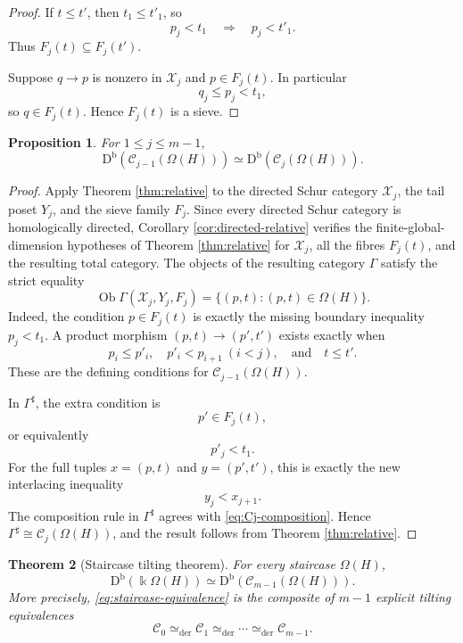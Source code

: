 \documentclass[12pt,a4paper,english,reqno]{amsart}
\theoremstyle{plain}
\newtheorem{theorem}{Theorem}[section]
\newtheorem{proposition}[theorem]{Proposition}
\theoremstyle{definition}
\newcommand{\kk}{\Bbbk}
\newcommand{\Db}{\mathrm D^{\mathrm b}}
\newcommand{\C}{\mathcal C}
\newcommand{\X}{\mathcal X}
\newcommand{\G}{\Gamma}
\newcommand{\Gs}{\Gamma^{\sharp}}
\begin{document}
\begin{proof}
If $t\leq t'$, then $t_1\leq t'_1$, so
\[
 p_j<t_1\quad\Longrightarrow\quad p_j<t'_1.
\]
Thus $F_j(t)\subseteq F_j(t')$.

Suppose $q\to p$ is nonzero in $\X_j$ and $p\in F_j(t)$.  In particular
\[
 q_j\leq p_j<t_1,
\]
so $q\in F_j(t)$.  Hence $F_j(t)$ is a sieve.
\end{proof}

\begin{proposition}
\label{prop:one-step}
For $1\leq j\leq m-1$,
\[
 \Db(\C_{j-1}(\Omega(H)))
 \simeq
 \Db(\C_j(\Omega(H))).
\]
\end{proposition}

\begin{proof}
Apply Theorem \ref{thm:relative} to the directed Schur category $\X_j$, the tail
poset $Y_j$, and the sieve family $F_j$.  Since every directed Schur
category is homologically directed, Corollary \ref{cor:directed-relative}
verifies the finite-global-dimension hypotheses of Theorem \ref{thm:relative} for
$\X_j$, all the fibres $F_j(t)$, and the resulting total category.
The objects of the resulting
category $\G$ satisfy the strict equality
\[
 \operatorname{Ob}\G(\X_j,Y_j,F_j)
 =
 \{(p,t):(p,t)\in\Omega(H)\}.
\]
Indeed, the condition $p\in F_j(t)$ is exactly the missing boundary
inequality $p_j<t_1$. A product morphism $(p,t)\to(p',t')$ exists exactly when
\[
 p_i\leq p'_i,\quad p'_i<p_{i+1}\ (i<j),
 \quad\text{and}\quad t\leq t'.
\]
These are the defining conditions for
$\C_{j-1}(\Omega(H))$.

In $\Gs$, the extra condition is
\[
 p'\in F_j(t),
\]
or equivalently
\[
 p'_j<t_1.
\]
For the full tuples $x=(p,t)$ and $y=(p',t')$, this is exactly the new
interlacing inequality
\[
 y_j<x_{j+1}.
\]
The composition rule in $\Gs$ agrees with
\eqref{eq:Cj-composition}.  Hence
$\Gs\cong\C_j(\Omega(H))$, and the result follows from Theorem 
\ref{thm:relative}.
\end{proof}

\begin{theorem}[Staircase tilting theorem]
\label{thm:staircase}
For every staircase $\Omega(H)$,
\begin{equation}
 \Db(\kk\Omega(H))
 \simeq
 \Db(\C_{m-1}(\Omega(H))).
\label{eq:staircase-equivalence}
\end{equation}
More precisely, \eqref{eq:staircase-equivalence} is the composite of
$m-1$ explicit tilting equivalences
\[
 \C_0\simeq_{\mathrm{der}}\C_1
 \simeq_{\mathrm{der}}\cdots
 \simeq_{\mathrm{der}}\C_{m-1}.
\]
\end{theorem}
\end{document}
